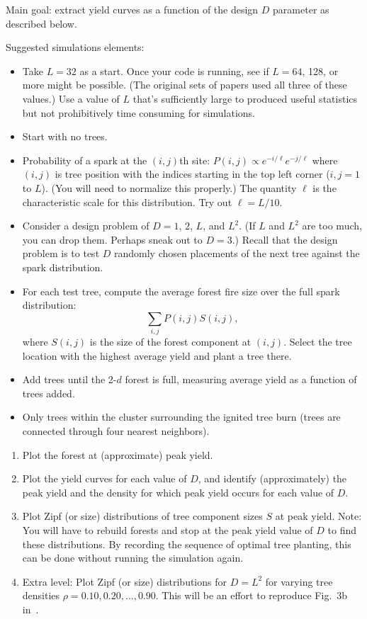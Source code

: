 \begin{enumerate}
  Main goal: extract yield curves as a function
  of the design $D$ parameter as described below.

  Suggested simulations elements:
  \begin{itemize}
  \item 
    Take $L=32$ as a start.  Once your code is running, see if $L=64$, 128, or more might
    be possible.
    (The original sets of papers used all three of these values.)
    Use a value of $L$ that's sufficiently large to produced useful
    statistics but not prohibitively time consuming for simulations.
  \item 
    Start with no trees.
  \item 
    Probability of a spark at the $(i,j)$th site:
    $
    P(i,j) \propto e^{-i/\ell} e^{-j/\ell}
    $
    where $(i,j)$ is tree position with the indices
    starting in the top left corner ($i,j=1$ to $L$).
    (You will need to normalize this properly.)
    The quantity $\ell$ is the characteristic
    scale for this distribution.
    Try out $\ell = L/10$.
  \item 
    Consider a design problem of $D=1$, $2$, $L$, and $L^{2}$.
    (If $L$ and $L^{2}$ are too much, you can drop them.
    Perhaps sneak out to $D=3$.)
    Recall that the design problem is to test $D$ randomly
    chosen placements of the next tree against the
    spark distribution.
  \item 
    For each test tree, 
    compute the average forest fire size over the full spark
    distribution: 
    $$
    \sum_{i,j} P(i,j) S(i,j),
    $$
    where $S(i,j)$ is the size of the forest component
    at $(i,j)$.
    Select the tree location with the highest average yield and plant a tree there.
  \item 
    Add trees until the 2-$d$ forest is full, measuring average yield as a function of trees added.
  \item 
    Only trees within the cluster surrounding the ignited tree burn
    (trees are connected through four nearest neighbors).
  \end{itemize}

  \begin{enumerate}
  \item 
    Plot the forest at (approximate) peak yield.
  \item 
    Plot the yield curves for each value of $D$,
    and identify (approximately) the peak yield and the density
    for which peak yield occurs for each value of $D$.
  \item 
    Plot Zipf (or size) distributions of tree component sizes $S$
    at peak yield.
    Note: You will have to rebuild forests
    and stop at the peak yield value of $D$ to
    find these distributions.
    By recording the sequence of optimal tree planting,
    this can be done without running the simulation again.
  \item
    Extra level: Plot Zipf (or size) distributions for $D=L^2$ for
    varying tree densities $\rho=0.10, 0.20, \ldots, 0.90$.
    This will be an effort to reproduce
    Fig.~3b in~\cite{carlson2000a}.
  \end{enumerate}


\end{enumerate}
